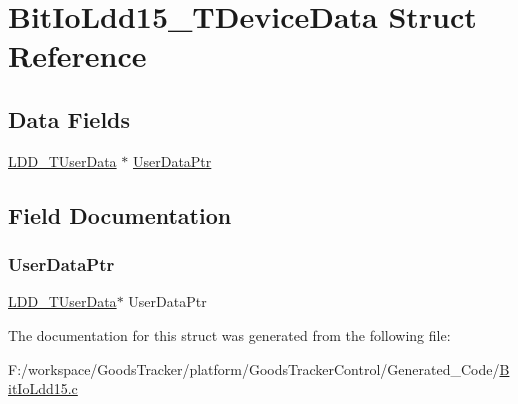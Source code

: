 \hypertarget{struct_bit_io_ldd15___t_device_data}{}\section{Bit\+Io\+Ldd15\+\_\+\+T\+Device\+Data Struct Reference}
\label{struct_bit_io_ldd15___t_device_data}
\subsection*{Data Fields}
\begin{DoxyCompactItemize}
\item 
\hyperlink{group___p_e___types__module_ga0b66a73f87238a782318aa0be7578e35}{L\+D\+D\+\_\+\+T\+User\+Data} $\ast$ \hyperlink{struct_bit_io_ldd15___t_device_data_a8e77b9d030b00c231823350a904e0f83}{User\+Data\+Ptr}
\end{DoxyCompactItemize}


\subsection{Field Documentation}
\mbox{\label{struct_bit_io_ldd15___t_device_data_a8e77b9d030b00c231823350a904e0f83}} 
\subsubsection{\texorpdfstring{User\+Data\+Ptr}{UserDataPtr}}
{\footnotesize\ttfamily \hyperlink{group___p_e___types__module_ga0b66a73f87238a782318aa0be7578e35}{L\+D\+D\+\_\+\+T\+User\+Data}$\ast$ User\+Data\+Ptr}



The documentation for this struct was generated from the following file\+:\begin{DoxyCompactItemize}
\item 
F\+:/workspace/\+Goods\+Tracker/platform/\+Goods\+Tracker\+Control/\+Generated\+\_\+\+Code/\hyperlink{_bit_io_ldd15_8c}{Bit\+Io\+Ldd15.\+c}\end{DoxyCompactItemize}
